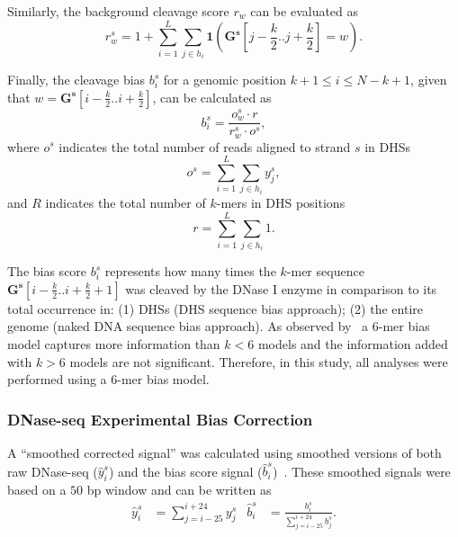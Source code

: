 Similarly, the background cleavage score ${r}_{w}$ can be evaluated as
\begin{equation}
  \label{eq:backcleav}
  r_w^s = 1 + \sum_{i=1}^L \sum_{j \in h_i} \mathbf{1} \left( \mathbf{G^s}[j-\frac{k}{2} .. j+\frac{k}{2}] = w\right).
\end{equation}

Finally, the cleavage bias ${b}_{i}^{s}$ for a genomic position $k+1 \leq i \leq N-k+1$, given that $w=\mathbf{G^s}[i-\frac{k}{2}..i+\frac{k}{2}]$, can be calculated as
\begin{equation}
  \label{eq:cleavbias}
  b_i^s = \frac{o^s_w \cdot r}{r^s_w \cdot o^s},
\end{equation}
where $o^s$ indicates the total number of reads aligned to strand $s$ in DHSs
\begin{equation}
  \label{eq:obscleav2}
  o^s = \sum_{i=1}^L \sum_{j \in h_i} {y}^{s}_{j},
\end{equation}
and $R$ indicates the total number of $k$-mers in DHS positions
\begin{equation}
  \label{eq:backcleav2}
  r = \sum_{i=1}^{L}\sum_{j \in h_i} 1.
\end{equation}

The bias score ${b}_{i}^{s}$ represents how many times the $k$-mer sequence $\mathbf{G^s}[i-\frac{k}{2}..i+\frac{k}{2}+1]$ was cleaved by the DNase I enzyme in comparison to its total occurrence in: (1) DHSs (DHS sequence bias approach); (2) the entire genome (naked DNA sequence bias approach). As observed by~\cite{he2014} a $6$-mer bias model captures more information than $k < 6$ models and the information added with $k > 6$ models are not significant. Therefore, in this study, all analyses were performed using a $6$-mer bias model.

\subsubsection{DNase-seq Experimental Bias Correction}
\label{sec:dnase.experimental.bias.correction}

A ``smoothed corrected signal'' was calculated using smoothed versions of both raw DNase-seq (${\hat{y}}_{i}^{s}$) and the bias score signal (${\hat{b}}_{i}^{s}$)~\cite{he2014}. These smoothed signals were based on a $50$ bp window and can be written as
\begin{align}
  \label{eq:biassignal}
  {\hat{y}}_{i}^{s} &= \sum_{j=i-25}^{i+24} {y}_{j}^{s} & {\hat{b}}_{i}^{s} &= \frac{{b}_{i}^{s}}{\sum_{j=i-25}^{i+24} {b}_{j}^{s}}.
\end{align}

